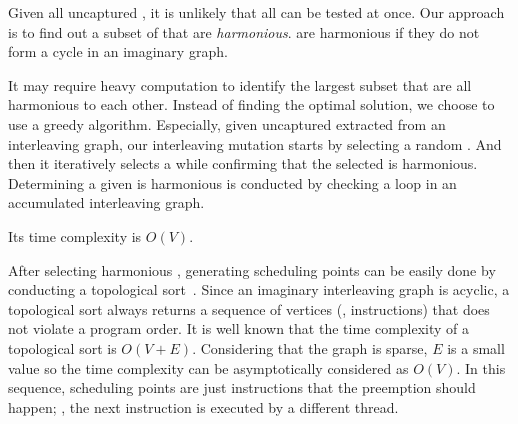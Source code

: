 %
Given all uncaptured \segments, it is unlikely that all \segments can
be tested at once.
%
Our approach is to find out a subset of \segments that are
\textit{harmonious}. \Segments are harmonious if they do not form a
cycle in an imaginary graph.


It may require heavy computation to identify the largest subset that
are all harmonious to each other.
%
Instead of finding the optimal solution, we choose to use a greedy
algorithm.
%
Especially, given uncaptured \segments extracted from an interleaving
graph, our interleaving mutation starts by selecting a random
\segment.
%
And then it iteratively selects a \segment while confirming that the
selected \segment is harmonious.
%
Determining a given \segment is harmonious is conducted by checking a
loop in an accumulated interleaving graph.

Its time complexity is $O(V)$.


%
After selecting harmonious \segments, generating scheduling points can
be easily done by conducting a topological
sort~\cite{topologicalsort}.
%
Since an imaginary interleaving graph is acyclic, a topological sort
always returns a sequence of vertices (\ie, instructions) that does
not violate a program order.
%
It is well known that the time complexity of a topological sort is
$O(V+E)$. Considering that the graph is sparse, $E$ is a small value
so the time complexity can be asymptotically considered as $O(V)$.
%
In this sequence, scheduling points are just instructions that the
preemption should happen; \ie, the next instruction is executed by a
different thread.
%




